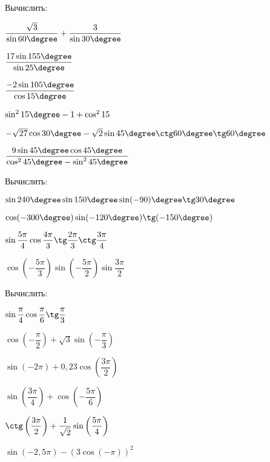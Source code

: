 \begin{class}[number=6]
	\begin{listofex}
		\item Вычислить:
		\begin{enumcols}[itemcolumns=2]
			\item \( \dfrac{\sqrt{3}}{\sin60\degree}+\dfrac{3}{\sin30\degree} \)
			\item \( \dfrac{17\sin155\degree}{\sin25\degree} \)
			\item \( \dfrac{-2\sin105\degree}{\cos15\degree} \)
			\item \( \sin^215\degree-1+\cos^215 \)
			\item \( -\sqrt{27}\cos30\degree-\sqrt{2}\sin45\degree\ctg60\degree\tg60\degree\)
			\item \( \dfrac{9\sin45\degree\cos45\degree}{\cos^245\degree-\sin^245\degree} \)
		\end{enumcols}
		\item Вычислить:
		\begin{enumcols}[itemcolumns=2]
			\item \( \sin240\degree\sin150\degree\sin(-90)\degree\tg30\degree \)
			\item \( \cos(-300\degree)\sin(-120\degree)\tg(-150\degree) \)
			\item \( \sin\dfrac{5\pi}{4}\cos\dfrac{4\pi}{3}\tg\dfrac{2\pi}{3}\ctg\dfrac{3\pi}{4} \)
			\item \( \cos\left( -\dfrac{5\pi}{3} \right)\sin\left( -\dfrac{5\pi}{2} \right)\sin\dfrac{3\pi}{2} \)
		\end{enumcols}
		\item Вычислить:
		\begin{enumcols}[itemcolumns=2]
			\item \( \sin\dfrac{\pi}{4}\cos\dfrac{\pi}{6}\tg\dfrac{\pi}{3} \)
			\item \( \cos\left( -\dfrac{\pi}{2} \right)+\sqrt{3}\sin\left( -\dfrac{\pi}{3} \right) \)
			\item \( \sin(-2\pi)+0,23\cos\left( \dfrac{3\pi}{2} \right) \)
			\item \( \sin\left( \dfrac{3\pi}{4} \right)+\cos\left( -\dfrac{5\pi}{6} \right) \)
			\item \( \ctg\left( \dfrac{3\pi}{2} \right)+\dfrac{1}{\sqrt{2}}\sin\left( \dfrac{5\pi}{4} \right) \)
			\item \( \sin(-2,5\pi)-(3\cos(-\pi))^2 \)
		\end{enumcols}

\end{listofex}
\end{class}
